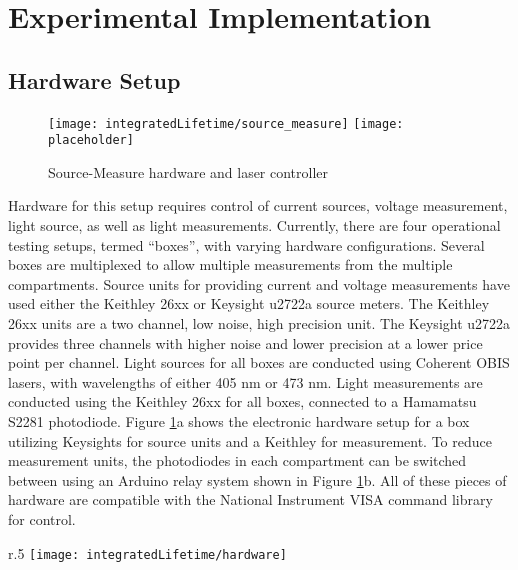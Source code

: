 \documentclass[../thesis.tex]{subfiles}
\begin{document}
\section{Experimental Implementation}
\subsection{Hardware Setup}

\begin{figure}[ht]
    \begin{minipage}{\linewidth}
    \centering
    \texttt{[image: integratedLifetime/source\_measure]}
    \texttt{[image: placeholder]}
    \caption{Source-Measure hardware and laser controller}
    \label{fig:source_measure}
    \end{minipage}
\end{figure}

Hardware for this setup requires control of current sources, voltage measurement, light source, as well as light measurements. 
Currently, there are four operational testing setups, termed ``boxes'', with varying hardware configurations.
Several boxes are multiplexed to allow multiple measurements from the multiple compartments.
Source units for providing current and voltage measurements have used either the Keithley 26xx or Keysight u2722a source meters.  
The Keithley 26xx units are a two channel, low noise, high precision unit.
The Keysight u2722a provides three channels with higher noise and lower precision at a lower price point per channel.
Light sources for all boxes are conducted using Coherent OBIS lasers, with wavelengths of either 405 nm or 473 nm.
Light measurements are conducted using the Keithley 26xx for all boxes, connected to a Hamamatsu S2281 photodiode.
Figure \ref{fig:source_measure}a shows the electronic hardware setup for a box utilizing Keysights for source units and a Keithley for measurement.
To reduce measurement units, the photodiodes in each compartment can be switched between using an Arduino relay system shown in Figure \ref{fig:source_measure}b.
All of these pieces of hardware are compatible with the National Instrument VISA command library for control.

\begin{wrapfigure}{r}{.5\textwidth}
\centering
\texttt{[image: integratedLifetime/hardware]}
\caption{Device contacting, measurement, and optical hardware.  Version 3 of the hardware is shown.  Controlling hardware is shown in Fig. \ref{fig:source_measure}}
\label{fig:hardware}
\end{wrapfigure}
\end{document}
